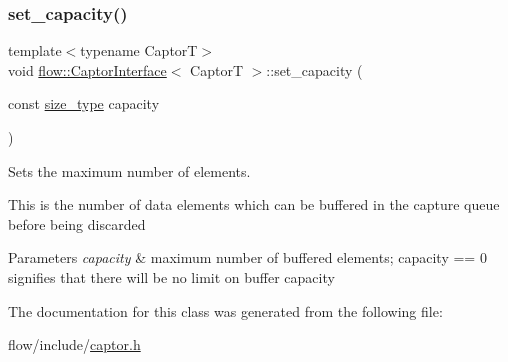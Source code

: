 \subsubsection{\texorpdfstring{set\+\_\+capacity()}{set\_capacity()}}
{\footnotesize\ttfamily template$<$typename CaptorT$>$ \\
void \hyperlink{classflow_1_1_captor_interface}{flow\+::\+Captor\+Interface}$<$ CaptorT $>$\+::set\+\_\+capacity (\begin{DoxyParamCaption}\item[{const \hyperlink{classflow_1_1_captor_interface_a62db6a158eebcb377e63ede6a1f1a8c6}{size\+\_\+type}}]{capacity }\end{DoxyParamCaption})\hspace{0.3cm}{\ttfamily [inline]}}



Sets the maximum number of elements. 

This is the number of data elements which can be buffered in the capture queue before being discarded


\begin{DoxyParams}{Parameters}
{\em capacity} & maximum number of buffered elements; {\ttfamily capacity == 0} signifies that there will be no limit on buffer capacity \\
\hline
\end{DoxyParams}


The documentation for this class was generated from the following file\+:\begin{DoxyCompactItemize}
\item 
flow/include/\hyperlink{captor_8h}{captor.\+h}\end{DoxyCompactItemize}

